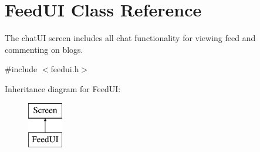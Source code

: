 \hypertarget{classFeedUI}{}\section{Feed\+UI Class Reference}
\label{classFeedUI}


The chat\+UI screen includes all chat functionality for viewing feed and commenting on blogs.  




{\ttfamily \#include $<$feedui.\+h$>$}

Inheritance diagram for Feed\+UI\+:\begin{figure}[H]
\begin{center}
\leavevmode
\includegraphics[height=2.000000cm]{classFeedUI}
\end{center}
\end{figure}
